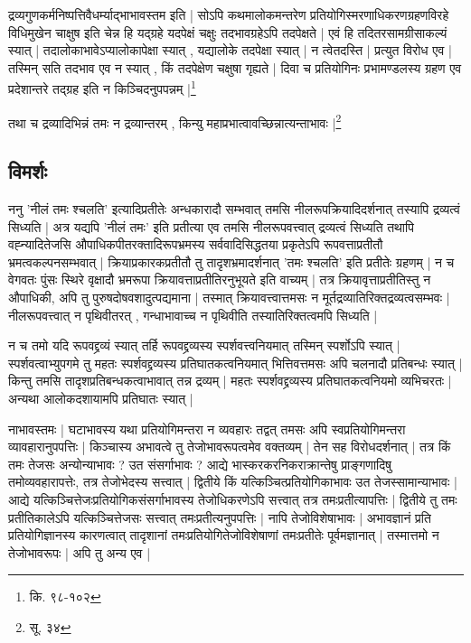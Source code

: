 {\fontsize{11.7}{0}\selectfont\s  द्रव्यगुणकर्मनिष्पत्तिवैधर्म्याद्भाभावस्तम इति | सोऽपि कथमालोकमन्तरेण प्रतियोगिस्मरणाधिकरणग्रहणविरहे विधिमुखेन चाक्षुष इति चेन्न हि यद्ग्रहे यदपेक्षं चक्षुः तदभावग्रहेऽपि तदपेक्षते | एवं हि तदितरसामग्रीसाकल्यं स्यात् | तदालोकाभावेऽप्यालोकापेक्षा स्यात् , यद्यालोके तदपेक्षा स्यात् | न त्वेतदस्ति | प्रत्युत विरोध एव | तस्मिन् सति तदभाव एव न स्यात् , किं तदपेक्षेण चक्षुषा गृह्यते | दिवा च प्रतियोगिनः प्रभामण्डलस्य ग्रहण एव प्रदेशान्तरे तद्ग्रह इति न किञ्चिदनुपपन्नम् |\footnote{कि. ९८-१०२}}

{\fontsize{11.7}{0}\selectfont\s तथा च द्रव्यादिभिन्नं तमः न द्रव्यान्तरम् , किन्यु महाप्रभात्वावच्छिन्नात्यन्ताभावः |\footnote{सू. ३४}}

\subsection{विमर्शः}

ननु 'नीलं तमः श्चलति' इत्यादिप्रतीतेः अन्धकारादौ सम्भवात् तमसि नीलरूपक्रियादिदर्शनात् तस्यापि द्रव्यत्वं सिध्यति | अत्र यद्यपि 'नीलं तमः' इति प्रतीत्या एव तमसि नीलरूपवत्त्वात् द्रव्यत्वं सिध्यति तथापि वह्न्यादितेजसि औपाधिकपीतरक्तादिरूपभ्रमस्य सर्ववादिसिद्धतया प्रकृतेऽपि रूपवत्ताप्रतीतौ भ्रमत्वकल्पनसम्भवात् | क्रियाप्रकारकप्रतीतौ तु तादृशभ्रमादर्शनात् 'तमः श्चलति' इति प्रतीतेः ग्रहणम् | न च वेगवतः पुंसः स्थिरे वृक्षादौ भ्रमरूपा क्रियावत्ताप्रतीतिरनुभूयते इति वाच्यम् | तत्र क्रियावृत्ताप्रतीतिस्तु न औपाधिकी, अपि तु पुरुषदोषवशादुत्पद्यमाना | तस्मात् क्रियावत्त्वात्तमसः न मूर्तद्रव्यातिरिक्तद्रव्यत्वसम्भवः | नीलरूपवत्त्वात् न पृथिवीतरत् , गन्धाभावाच्च न पृथिवीति तस्यातिरिक्तत्वमपि सिध्यति | 

न च तमो यदि रूपवद्द्रव्यं स्यात् तर्हि रूपवद्द्रव्यस्य स्पर्शवत्त्वनियमात् तस्मिन् स्पर्शोऽपि स्यात् | स्पर्शवत्वाभ्युपगमे तु महतः स्पर्शवद्द्रव्यस्य प्रतिघातकत्वनियमात् भित्तिवत्तमसः अपि चलनादौ प्रतिबन्धः स्यात् | किन्तु तमसि तादृशप्रतिबन्धकत्वाभावात् तन्न द्रव्यम् | महतः स्पर्शवद्द्रव्यस्य प्रतिघातकत्वनियमो व्यभिचरतः | अन्यथा आलोकदशायामपि प्रतिघातः स्यात् |

नाभावस्तमः | घटाभावस्य यथा प्रतियोगिमन्तरा न व्यवहारः तद्वत् तमसः अपि स्वप्रतियोगिमन्तरा व्यावहारानुपपत्तिः |  किञ्चास्य अभावत्वे तु तेजोभावरूपत्वमेव वक्तव्यम् | तेन सह विरोधदर्शनात् | तत्र किं तमः तेजसः अन्योन्याभावः ? उत संसर्गाभावः ? आद्ये भास्करकरनिकराक्रान्तेषु प्राङ्गणादिषु तमोव्यवहारापत्तेः, तत्र तेजोभेदस्य सत्त्वात् | द्वितीये किं यत्किञ्चित्प्रतियोगिकाभावः उत तेजस्सामान्याभावः | आद्ये यत्किञ्चित्तेजःप्रतियोगिकसंसर्गाभावस्य तेजोधिकरणेऽपि सत्त्वात् तत्र तमःप्रतीत्यापत्तिः | द्वितीये तु तमः प्रतीतिकालेऽपि यत्किञ्चित्तेजसः सत्त्वात् तमःप्रतीत्यनुपपत्तिः | नापि तेजोविशेषाभावः | अभावज्ञानं प्रति प्रतियोगिज्ञानस्य कारणत्वात् तादृशानां तमःप्रतियोगितेजोविशेषाणां तमःप्रतीतेः पूर्वमज्ञानात् | तस्मात्तमो न तेजोभावरूपः | अपि तु अन्य एव | 

